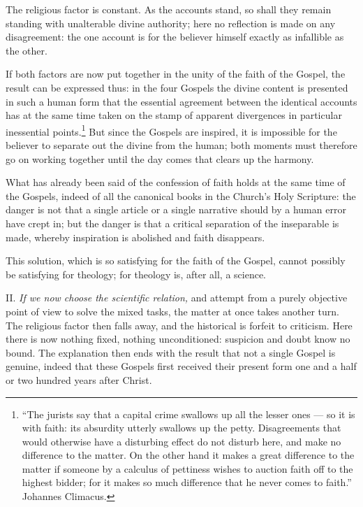 \documentclass[12pt,a4paper]{book}
\begin{document}
The religious factor is constant. As the accounts stand, so shall they remain
standing with unalterable divine authority; here no reflection is made on any
disagreement: the one account is for the believer himself exactly as infallible as
the other.

If both factors are now put together in the unity of the faith of the Gospel, the
result can be expressed thus: in the four Gospels the divine content is presented
in such a human form that the essential agreement between the identical accounts
has at the same time taken on the stamp of apparent divergences in
particular inessential points.\footnote{``The jurists say that a capital crime
swallows up all the lesser ones --- so it is with faith: its absurdity utterly
swallows up the petty. Disagreements that would otherwise have a disturbing effect
do not disturb here, and make no difference to the matter. On the other hand it
makes a great difference to the matter if someone by a calculus of pettiness
wishes to auction faith off to the highest bidder; for it makes so much difference
that he never comes to faith.'' Johannes Climacus.} But since the Gospels are
inspired, it is impossible for the believer to separate out the divine from the
human; both moments must therefore go on working together until the day comes that
clears up the harmony.

What has already been said of the confession of faith holds at the same time of
the Gospels, indeed of all the canonical books in the Church's Holy Scripture: the
danger is not that a single article or a single narrative should by a human error
have crept in; but the danger is that a critical separation of the inseparable is
made, whereby inspiration is abolished and faith disappears.

This solution, which is so satisfying for the faith of the Gospel, cannot possibly
be satisfying for theology; for theology is, after all, a science.

II. \emph{If we now choose the scientific relation,} and attempt from a purely
objective point of view to solve the mixed tasks, the matter at once takes another
turn. The religious factor then falls away, and the historical is forfeit to
criticism. Here there is now nothing fixed, nothing unconditioned: suspicion and
doubt know no bound. The explanation then ends with the result that not a single
Gospel is genuine, indeed that these Gospels first received their present form one
and a half or two hundred years after Christ.
\end{document}
